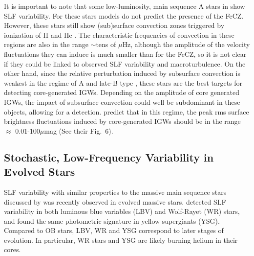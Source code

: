 \documentclass[twocolumn]{aastex63}
\begin{document}
It is important to note that some low-luminosity, main sequence A stars in \citet{Bowman:2019} show SLF variability. For these stars models do not predict the presence of the FeCZ. However, these stars still show (sub)surface convection zones triggered by ionization of H and He \citep{Cantiello:2019}.  The characteristic frequencies of convection in these regions are also in the range $\sim$tens of $\mu$Hz, although the  amplitude of the velocity fluctuations they can induce is much smaller than for the FeCZ, so it is not clear if they could be linked to observed SLF variability and macroturbulence. On the other hand, since the relative perturbation induced by subsurface convection is weakest in the regime  of A and late-B type \citep{Cantiello:2019,Jermyn:2020},
these stars are the best targets for detecting core-generated IGWs.  Depending on the amplitude of core generated IGWs, the impact of subsurface convection could well be subdominant in these objects, allowing for a detection. \citet{Shiode:2013} predict that in this regime, the peak rms surface brightness fluctuations induced by core-generated IGWs should be in the range $\approx$ 0.01-100$\mu$mag (See their Fig.~6). 

\subsection{Stochastic, Low-Frequency Variability in Evolved Stars}
SLF variability with similar properties to the massive main sequence stars discussed by \citep{Bowman:2019,Bowman:2020} was recently observed in evolved massive stars.
\citet{Naze:2021} detected SLF variability in both luminous blue variables (LBV) and Wolf-Rayet (WR) stars, and \citet{Dorn:2020} found the same photometric signature in yellow supergiants (YSG).  
Compared to OB stars, LBV, WR and YSG correspond to later stages of evolution. In particular, WR stars and YSG are likely burning helium in their cores. 
\end{document}
